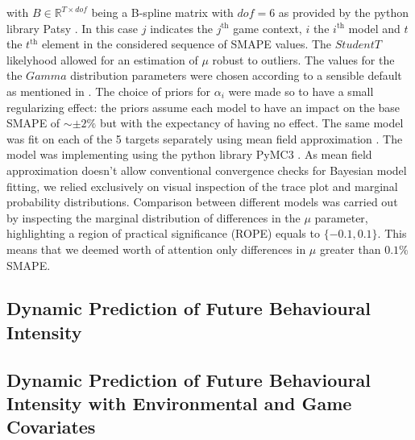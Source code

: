 with $B \in \mathbb{R}^{T \times dof}$ being a B-spline matrix with $dof=6$ as provided by the python library Patsy \cite{patsy}. In this case $j$ indicates the $j^{\text{th}}$ game context, $i$ the $i^{\text{th}}$ model and $t$ the $t^{\text{th}}$ element in the considered sequence of SMAPE values. The $StudentT$ likelyhood allowed for an estimation of $\mu$ robust to outliers. The values for the the $Gamma$ distribution parameters were chosen according to a sensible default as mentioned in \cite{vehtarinu}. The choice of priors for $\alpha_{i}$ were made so to have a small regularizing effect: the priors assume each model to have an impact on the base SMAPE of $\sim \pm 2\% $ but with the expectancy of having no effect. The same model was fit on each of the 5 targets separately using mean field approximation \cite{kucukelbir2017automatic}. The model was implementing using the python library PyMC3 \cite{salvatier2016probabilistic}. As mean field approximation doesn't allow conventional convergence checks for Bayesian model fitting, we relied exclusively on visual inspection of the trace plot and marginal probability distributions. Comparison between different models was carried out by inspecting the marginal distribution of differences in the $\mu$ parameter, highlighting a region of practical significance (ROPE) equals to $\{-0.1, 0.1\}$. This means that we deemed worth of attention only differences in $\mu$ greater than $0.1\%$ SMAPE.

\subsection{Dynamic Prediction of Future Behavioural Intensity}
\label{dynamic_prediction_ancillary_perf}

\subsection{Dynamic Prediction of Future Behavioural Intensity with Environmental and Game Covariates}
\label{dynamic_env_even_prediction_ancillary_perf}

